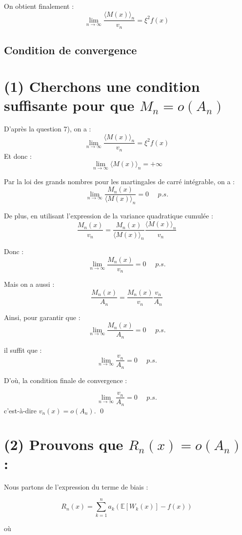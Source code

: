 \documentclass[12pt]{article}
\begin{document}
On obtient finalement :
\[
\boxed{
\lim_{n \to \infty} \frac{\langle M(x) \rangle_n}{v_n} = \xi^2 f(x)
}
\]

\subsection{Condition de convergence}

\section*{(1)  Cherchons une condition suffisante pour que $ M_n = o(A_n) $}

D'après la question 7), on a :
\[
\lim_{n \to \infty} \frac{\langle M(x) \rangle_n}{v_n} = \xi^2 f(x)
\]
Et donc :
\[
\lim_{n \to \infty} \langle M(x) \rangle_n = +\infty
\]

Par la loi des grands nombres pour les martingales de carré intégrable, on a : 
\[
\lim_{n \to \infty} \frac{ M_n(x)}{ \langle M(x) \rangle_n} = 0  ~~~~~~  p.s.
\] 

De plus, en utilisant l'expression de la variance quadratique cumulée :
\[ 
\frac{ M_n(x)}{ v_n} = \frac{ M_n(x)}{ \langle M(x) \rangle_n} \frac{  \langle M(x) \rangle_n}{ v_n}
\]

Donc : \[ \lim_{n \to \infty} \frac{ M_n(x)}{ v_n} = 0  ~~~~~~  p.s. \]

Mais on a aussi :
\[ 
\frac{ M_n(x)}{ A_n} = \frac{ M_n(x)}{ v_n} \frac{  v_n}{ A_n}
\]

Ainsi, pour garantir que :
\[ \lim_{n \to \infty} \frac{ M_n(x)}{ A_n} = 0  ~~~~~~  p.s. \]

il suffit que : \[ \lim_{n \to \infty} \frac{ v_n}{ A_n} = 0  ~~~~~~  p.s. \]

D'où, la condition finale de convergence :

\[ \lim_{n \to \infty} \frac{ v_n}{ A_n} = 0  ~~~~~~  p.s. \] c'est-à-dire $v_n(x) = o(A_n)$. \qed





\section*{(2)  Prouvons que $R_n(x) = o(A_n)$ :}

Nous partons de l'expression du terme de biais :

\[ R_n(x) = \sum_{k=1}^n a_k \left(\mathbb{E}[W_k(x)] - f(x)\right) \]

où 
\end{document}
